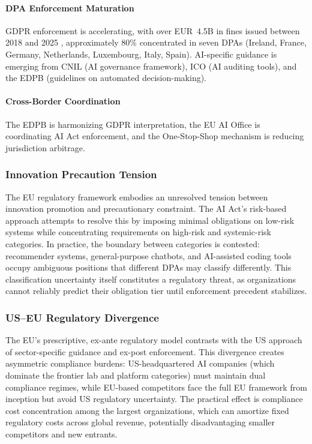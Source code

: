 \documentclass[11pt,a4paper]{article}
\begin{document}
\paragraph{DPA Enforcement Maturation} GDPR enforcement is accelerating, with over EUR~4.5B in fines issued between 2018 and 2025 \cite{gdprenforcement2023}, approximately 80\% concentrated in seven DPAs (Ireland, France, Germany, Netherlands, Luxembourg, Italy, Spain). AI-specific guidance is emerging from CNIL (AI governance framework), ICO (AI auditing tools), and the EDPB (guidelines on automated decision-making).

\paragraph{Cross-Border Coordination} The EDPB is harmonizing GDPR interpretation, the EU AI Office is coordinating AI Act enforcement, and the One-Stop-Shop mechanism is reducing jurisdiction arbitrage.

\subsubsection{Innovation Precaution Tension}

The EU regulatory framework embodies an unresolved tension between innovation promotion and precautionary constraint. The AI Act's risk-based approach attempts to resolve this by imposing minimal obligations on low-risk systems while concentrating requirements on high-risk and systemic-risk categories. In practice, the boundary between categories is contested: recommender systems, general-purpose chatbots, and AI-assisted coding tools occupy ambiguous positions that different DPAs may classify differently. This classification uncertainty itself constitutes a regulatory threat, as organizations cannot reliably predict their obligation tier until enforcement precedent stabilizes.

\subsubsection{US--EU Regulatory Divergence}

The EU's prescriptive, ex-ante regulatory model contrasts with the US approach of sector-specific guidance and ex-post enforcement. This divergence creates asymmetric compliance burdens: US-headquartered AI companies (which dominate the frontier lab and platform categories) must maintain dual compliance regimes, while EU-based competitors face the full EU framework from inception but avoid US regulatory uncertainty. The practical effect is compliance cost concentration among the largest organizations, which can amortize fixed regulatory costs across global revenue, potentially disadvantaging smaller competitors and new entrants.
\end{document}
